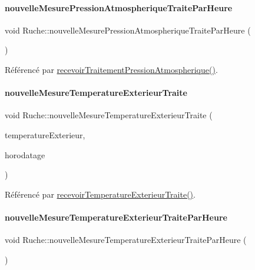 \paragraph{\texorpdfstring{nouvelle\+Mesure\+Pression\+Atmospherique\+Traite\+Par\+Heure}{nouvelleMesurePressionAtmospheriqueTraiteParHeure}}
{\footnotesize\ttfamily void Ruche\+::nouvelle\+Mesure\+Pression\+Atmospherique\+Traite\+Par\+Heure (\begin{DoxyParamCaption}{ }\end{DoxyParamCaption})\hspace{0.3cm}{\ttfamily [signal]}}



Référencé par \hyperlink{class_ruche_aa42daeffa023c83fde40072601e1fa39}{recevoir\+Traitement\+Pression\+Atmospherique()}.

\mbox{\label{class_ruche_a5b85ea246b58776a96e2ff7bd701daa7}} 
\paragraph{\texorpdfstring{nouvelle\+Mesure\+Temperature\+Exterieur\+Traite}{nouvelleMesureTemperatureExterieurTraite}}
{\footnotesize\ttfamily void Ruche\+::nouvelle\+Mesure\+Temperature\+Exterieur\+Traite (\begin{DoxyParamCaption}\item[{double}]{temperature\+Exterieur,  }\item[{Q\+String}]{horodatage }\end{DoxyParamCaption})\hspace{0.3cm}{\ttfamily [signal]}}



Référencé par \hyperlink{class_ruche_a1d9b1d3aad20f206f27de4093b4a136f}{recevoir\+Temperature\+Exterieur\+Traite()}.

\mbox{\label{class_ruche_ac0d7e104549abdfa87691618aba6291b}} 
\paragraph{\texorpdfstring{nouvelle\+Mesure\+Temperature\+Exterieur\+Traite\+Par\+Heure}{nouvelleMesureTemperatureExterieurTraiteParHeure}}
{\footnotesize\ttfamily void Ruche\+::nouvelle\+Mesure\+Temperature\+Exterieur\+Traite\+Par\+Heure (\begin{DoxyParamCaption}{ }\end{DoxyParamCaption})\hspace{0.3cm}{\ttfamily [signal]}}



